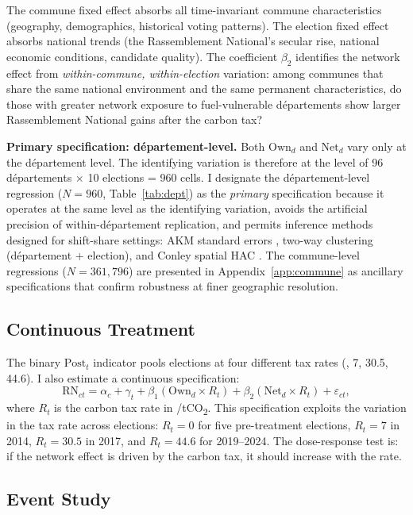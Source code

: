 \documentclass[12pt]{article}
\providecommand{\euro}{\texteuro}
\newcommand{\rn}{Rassemblement National}
\newcommand{\dept}{d\'{e}partement}
\newcommand{\depts}{d\'{e}partements}
\begin{document}
The commune fixed effect absorbs all time-invariant commune characteristics (geography, demographics, historical voting patterns). The election fixed effect absorbs national trends (the \rn{}'s secular rise, national economic conditions, candidate quality). The coefficient $\beta_2$ identifies the network effect from \emph{within-commune, within-election} variation: among communes that share the same national environment and the same permanent characteristics, do those with greater network exposure to fuel-vulnerable \depts{} show larger \rn{} gains after the carbon tax?

\textbf{Primary specification: \dept{}-level.} Both $\text{Own}_d$ and $\text{Net}_d$ vary only at the \dept{} level. The identifying variation is therefore at the level of 96 \depts{} $\times$ 10 elections = 960 cells. I designate the \dept{}-level regression ($N = 960$, Table~\ref{tab:dept}) as the \emph{primary} specification because it operates at the same level as the identifying variation, avoids the artificial precision of within-\dept{} replication, and permits inference methods designed for shift-share settings: AKM standard errors \citep{adao2019shift}, two-way clustering (\dept{} + election), and Conley spatial HAC \citep{conley1999gmm}. The commune-level regressions ($N = 361{,}796$) are presented in Appendix~\ref{app:commune} as ancillary specifications that confirm robustness at finer geographic resolution.

\subsection{Continuous Treatment}

The binary $\text{Post}_t$ indicator pools elections at four different tax rates (\euro 0, 7, 30.5, 44.6). I also estimate a continuous specification:
\begin{equation}
\text{RN}_{ct} = \alpha_c + \gamma_t + \beta_1 (\text{Own}_d \times R_t) + \beta_2 (\text{Net}_d \times R_t) + \varepsilon_{ct},
\label{eq:continuous}
\end{equation}
where $R_t$ is the carbon tax rate in \euro/tCO\textsubscript{2}. This specification exploits the variation in the tax rate across elections: $R_t = 0$ for five pre-treatment elections, $R_t = 7$ in 2014, $R_t = 30.5$ in 2017, and $R_t = 44.6$ for 2019--2024. The dose-response test is: if the network effect is driven by the carbon tax, it should increase with the rate.

\subsection{Event Study}
\end{document}
